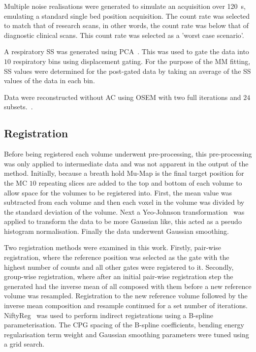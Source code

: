         Multiple noise realisations were generated to simulate an acquisition over \SI{120}{\second}, emulating a standard single bed position acquisition. The count rate was selected to match that of research scans, in other words, the count rate was below that of diagnostic clinical scans. This count rate was selected as a 'worst case scenario'.
        
        A respiratory \gls{SS} was generated using \gls{PCA}~\cite{Thielemans2011}. This was used to gate the data into $10$ respiratory bins using displacement gating. For the purpose of the \gls{MM} fitting, \gls{SS} values were determined for the post-gated data by taking an average of the \gls{SS} values of the data in each bin.
        
        Data were reconstructed without \gls{AC} using OSEM with two full iterations and $24$ subsets.~\cite{Hudson1994}.
    
    \vspace{-0.4cm}
    
    \subsection{Registration} \label{sec:registration}
        Before being registered each volume underwent pre-processing, this pre-processing was only applied to intermediate data and was not apparent in the output of the method. Initially, because a breath hold \gls{Mu-Map} is the final target position for the \gls{MC} $10$ repeating slices are added to the top and bottom of each volume to allow space for the volumes to be registered into. First, the mean value was subtracted from each volume and then each voxel in the volume was divided by the standard deviation of the volume. Next a Yeo-Johnson transformation~\cite{Johnson2013} was applied to transform the data to be more Gaussian like, this acted as a pseudo histogram normalisation. Finally the data underwent Gaussian smoothing.
        
        Two registration methods were examined in this work. Firstly, pair-wise registration, where the reference position was selected as the gate with the highest number of counts and all other gates were registered to it. Secondly, group-wise registration, where after an initial pair-wise registration step the  generated had the inverse mean of all  composed with them before a new reference volume was resampled. Registration to the new reference volume followed by the inverse mean composition and resample continued for a set number of iterations. NiftyReg~\cite{Modat2010} was used to perform indirect registrations using a B-spline parameterisation. The \gls{CPG} spacing of the B-spline coefficients, bending energy regularisation term weight and Gaussian smoothing parameters were tuned using a grid search.
    
